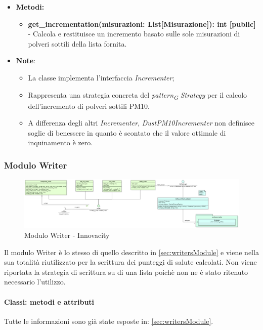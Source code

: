 \begin{itemize}
    \begin{itemize}
    \item \textbf{Metodi: } 
    \begin{itemize}
        \item \textbf{get\_incrementation(misurazioni: List[Misurazione]): int [public]} - Calcola e restituisce un incremento basato sulle sole misurazioni di polveri sottili della lista fornita.
    \end{itemize}
    \item\textbf{Note}:
        \begin{itemize}
            \item La classe implementa l'interfaccia \textit{Incrementer};
            \item Rappresenta una strategia concreta del \textit{pattern}\textsubscript{\textit{G}} \textit{Strategy} per il calcolo dell'incremento di polveri sottili PM10.
            \item A differenza degli altri \textit{Incrementer}, \textit{DustPM10Incrementer} non definisce soglie di benessere in quanto è scontato che il valore ottimale di inquinamento è zero.
        \end{itemize}
    \end{itemize}

\end{itemize}

\subsubsection{Modulo Writer}
\begin{figure}[H]
    \centering
    \includegraphics[width=1\textwidth]{../Images/SpecificaTecnica/writerModule.PNG}
    \caption{Modulo Writer - Innovacity}
    \label{fig: healthModelloWriter}
\end{figure}
Il modulo Writer è lo stesso di quello descritto in \ref*{sec:writersModule} e viene nella sua totalità riutilizzato per la scrittura dei punteggi di salute calcolati.
Non viene riportata la strategia di scrittura su di una lista poichè non ne è stato ritenuto necessario l'utilizzo.

\paragraph*{Classi: metodi e attributi}
Tutte le informazioni sono già state esposte in: \ref*{sec:writersModule}.

